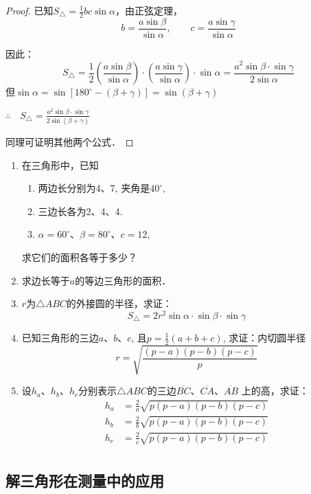 \begin{proof}
已知$S_{\triangle}=\frac{1}{2}bc\sin\alpha$，由正弦定理，
\[b=\frac{a\sin \beta}{\sin\alpha},\qquad c=\frac{a\sin\gamma}{\sin\alpha}\]

因此：
\[S_{\triangle}=\frac{1}{2}\left(\frac{a\sin \beta}{\sin\alpha}\right)\cdot\left(\frac{a\sin\gamma}{\sin\alpha}\right)\cdot \sin\alpha=\frac{a^2\sin\beta\cdot \sin\gamma}{2\sin\alpha}\]
但$\sin\alpha=\sin[180^{\circ}-(\beta+\gamma)]=\sin(\beta+\gamma)$

$\therefore\quad S_{\triangle}=\frac{a^{2} \sin \beta \cdot \sin \gamma}{2 \sin (\beta+\gamma)}$

同理可证明其他两个公式．
\end{proof}


\begin{ex}
\begin{enumerate}
    \item 在三角形中，已知
\begin{enumerate}
\item 两边长分别为4、7, 夹角是$40^{\circ}$,
\item 三边长各为2、4、4.
\item $\alpha=60^{\circ}$、$\beta=80^{\circ}$、$c=12$,
\end{enumerate}
    求它们的面积各等于多少？
    \item 求边长等于$a$的等边三角形的面积．

    \item $r$为$\triangle ABC$的外接圆的半径，求证：
\[S_{\triangle}=2r^2 \sin\alpha\cdot\sin\beta\cdot \sin\gamma\]

\item 已知三角形的三边$a$、$b$、$c$, 且$p=\frac{1}{2}(a+b+c)$, 
求证：内切圆半径
\[r=\sqrt{\frac{(p-a)(p-b)(p-c)}{p}}\]

\item 设$h_a$、$h_b$、$h_c$分别表示$\triangle ABC$的三边$\overline{BC}$、$\overline{CA}$、$\overline{AB}$
上的高，求证：
\[\begin{split}
    h_a&=\frac{2}{a}\sqrt{p(p-a)(p-b)(p-c)}\\
    h_b&=\frac{2}{b}\sqrt{p(p-a)(p-b)(p-c)}\\
    h_c&=\frac{2}{c}\sqrt{p(p-a)(p-b)(p-c)}\\
\end{split}\]
\end{enumerate}
\end{ex}

\subsection{解三角形在测量中的应用}

